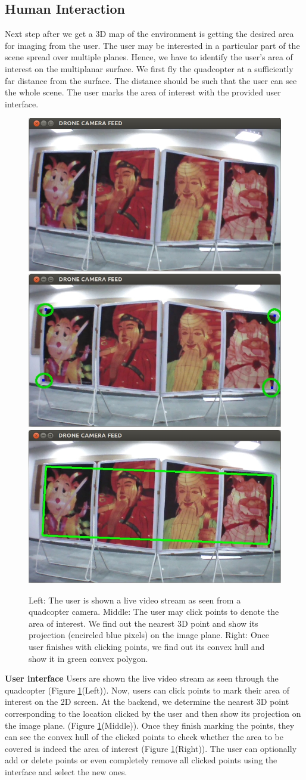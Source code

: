\subsection{Human Interaction}
Next step after we get a 3D map of the environment is getting the desired area for
imaging from the user. The user may be interested in a particular part of
the scene spread over multiple planes. Hence, we have to identify the user's
area of interest on the multiplanar surface. We first fly the quadcopter at a
sufficiently far distance from the surface. The distance should be such that the user can see the whole
scene. The user marks the area of interest with the provided user interface.\\
\begin{figure}[t!]
\centering
\includegraphics[width=0.31\linewidth]{images/UI_input}
\includegraphics[width=0.31\linewidth]{images/UI_points_marked}
\includegraphics[width=0.31\linewidth]{images/UI_convexHull}
\caption[Our user interface]{Left: The user is shown a live video stream as seen
from a quadcopter camera. Middle: The user may click points to denote the area of interest. We 
find out the nearest 3D point and show its projection (encircled blue pixels) on
the image plane. Right: Once user finishes with clicking points, we find out its convex
hull and show it in green convex polygon.}
\label{fig:ui}
\end{figure}
\textbf{User interface} Users are shown the live video stream as seen through
the quadcopter (Figure \ref{fig:ui}(Left)). Now, users can click points to
mark their area of interest on the 2D screen. At the backend, we determine the
nearest 3D point corresponding to the location clicked by the user and then show
its projection on the image plane. (Figure \ref{fig:ui}(Middle)). Once they
finish marking the points, they can see the convex hull of the
clicked points to check whether the area to be covered is indeed the area of
interest (Figure \ref{fig:ui}(Right)). The user can optionally add or delete points
or even completely remove all clicked points using the interface and select the
new ones.


